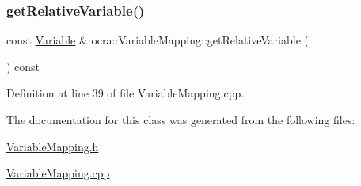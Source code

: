 \subsubsection{\texorpdfstring{get\+Relative\+Variable()}{getRelativeVariable()}}
{\footnotesize\ttfamily const \hyperlink{classocra_1_1Variable}{Variable} \& ocra\+::\+Variable\+Mapping\+::get\+Relative\+Variable (\begin{DoxyParamCaption}{ }\end{DoxyParamCaption}) const}



Definition at line 39 of file Variable\+Mapping.\+cpp.



The documentation for this class was generated from the following files\+:\begin{DoxyCompactItemize}
\item 
\hyperlink{VariableMapping_8h}{Variable\+Mapping.\+h}\item 
\hyperlink{VariableMapping_8cpp}{Variable\+Mapping.\+cpp}\end{DoxyCompactItemize}
